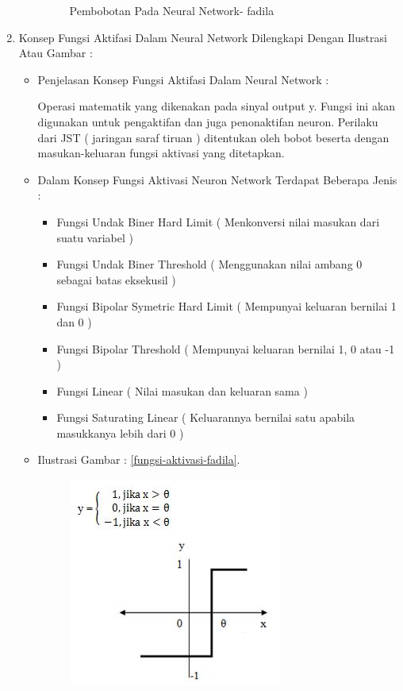 \begin{enumerate}
\begin{itemize}
\begin{figure}[!hbtp]
\caption{Pembobotan Pada Neural Network- fadila}
\label{bobot-neu-fadila}
\end{figure}
\par
\par
\end{itemize}
\par
\par
\item Konsep Fungsi Aktifasi Dalam Neural Network Dilengkapi Dengan Ilustrasi Atau Gambar :
\begin{itemize}
\item Penjelasan Konsep Fungsi Aktifasi Dalam Neural Network :
\par Operasi matematik yang dikenakan pada sinyal output y. Fungsi ini akan digunakan untuk pengaktifan dan juga penonaktifan neuron. Perilaku dari JST ( jaringan saraf tiruan ) ditentukan oleh bobot beserta dengan masukan-keluaran fungsi aktivasi yang ditetapkan.
\item Dalam Konsep Fungsi Aktivasi Neuron Network Terdapat Beberapa Jenis :
\begin{itemize}
\item Fungsi Undak Biner Hard Limit ( Menkonversi nilai masukan dari suatu variabel )
\item Fungsi Undak Biner Threshold ( Menggunakan nilai ambang 0 sebagai batas eksekusil )
\item Fungsi Bipolar Symetric Hard Limit ( Mempunyai keluaran bernilai 1 dan 0 )
\item Fungsi Bipolar Threshold ( Mempunyai keluaran bernilai 1, 0 atau -1 )
\item Fungsi Linear ( Nilai masukan dan keluaran sama )
\item Fungsi Saturating Linear ( Keluarannya bernilai satu apabila masukkanya lebih dari 0 )
\par
\end{itemize}
\item Ilustrasi Gambar : \ref{fungsi-aktivasi-fadila}.
\par
\begin{figure}[!hbtp]
\centering
\includegraphics[scale=0.2]{figures/fungsi-aktivasi-fadila.jpg}

\end{figure}
\end{itemize}
\end{enumerate}

